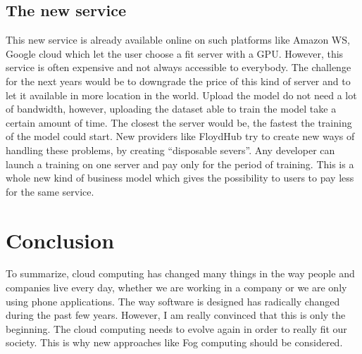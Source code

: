 \subsection{The new service}

This new service is already available online on such platforms like Amazon WS, Google cloud which let the user choose a fit server with a GPU. However, this service is often expensive and not always accessible to everybody. The challenge for the next years would be to downgrade the price of this kind of server and to let it available in more location in the world. Upload the model do not need a lot of bandwidth, however, uploading the dataset able to train the model take a certain amount of time. The closest the server would be, the fastest the training of the model could start. New providers like FloydHub try to create new ways of handling these problems, by creating “disposable severs”. Any developer can launch a training on one server and pay only for the period of training. This is a whole new kind of business model which gives the possibility to users to pay less for the same service.

\section{Conclusion}

To summarize, cloud computing has changed many things in the way people and companies live every day, whether we are working in a company or we are only using phone applications. The way software is designed has radically changed during the past few years. However, I am really convinced that this is only the beginning. The cloud computing needs to evolve again in order to really fit our society. This is why new approaches like Fog computing should be considered.
